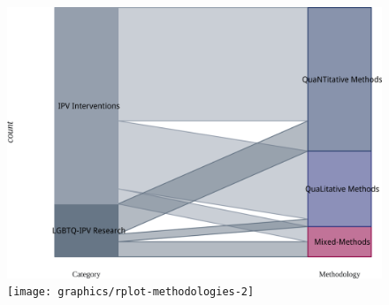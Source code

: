 \documentclass[]{tufte-handout}
\begin{document}
\begin{figure}
\includegraphics[width=\linewidth]{graphics/rplot-methodologies-1} \texttt{[image: graphics/rplot-methodologies-2]} \end{figure}

\newpage

\end{document}
